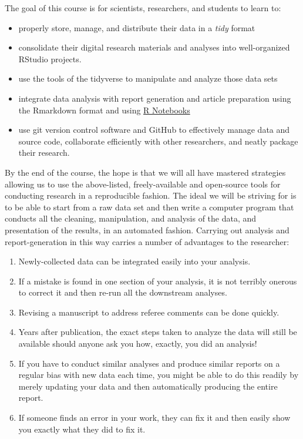 \documentclass[]{book}
\providecommand{\tightlist}{%
  \setlength{\itemsep}{0pt}\setlength{\parskip}{0pt}}
\theoremstyle{definition}
\theoremstyle{definition}
\theoremstyle{remark}
\begin{document}
The goal of this course is for scientists, researchers, and students to
learn to:

\begin{itemize}
\tightlist
\item
  properly store, manage, and distribute their data in a \emph{tidy}
  format
\item
  consolidate their digital research materials and analyses into
  well-organized RStudio projects.
\item
  use the tools of the tidyverse to manipulate and analyze those data
  sets
\item
  integrate data analysis with report generation and article preparation
  using the Rmarkdown format and using
  \href{http://rmarkdown.rstudio.com/r_notebooks.html}{R Notebooks}
\item
  use git version control software and GitHub to effectively manage data
  and source code, collaborate efficiently with other researchers, and
  neatly package their research.
\end{itemize}

By the end of the course, the hope is that we will all have mastered
strategies allowing us to use the above-listed, freely-available and
open-source tools for conducting research in a reproducible fashion. The
ideal we will be striving for is to be able to start from a raw data set
and then write a computer program that conducts all the cleaning,
manipulation, and analysis of the data, and presentation of the results,
in an automated fashion. Carrying out analysis and report-generation in
this way carries a number of advantages to the researcher:

\begin{enumerate}
\def\labelenumi{\arabic{enumi}.}
\tightlist
\item
  Newly-collected data can be integrated easily into your analysis.
\item
  If a mistake is found in one section of your analysis, it is not
  terribly onerous to correct it and then re-run all the downstream
  analyses.
\item
  Revising a manuscript to address referee comments can be done quickly.
\item
  Years after publication, the exact steps taken to analyze the data
  will still be available should anyone ask you how, exactly, you did an
  analysis!
\item
  If you have to conduct similar analyses and produce similar reports on
  a regular bias with new data each time, you might be able to do this
  readily by merely updating your data and then automatically producing
  the entire report.
\item
  If someone finds an error in your work, they can fix it and then
  easily show you exactly what they did to fix it.
\end{enumerate}
\end{document}
